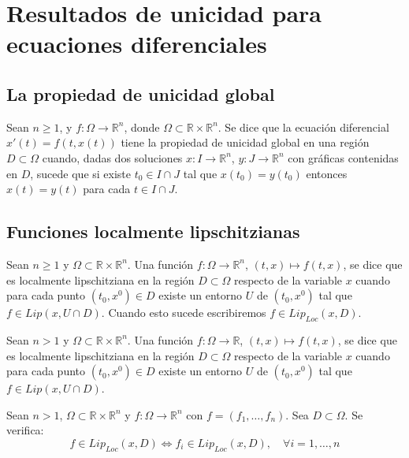 \chapter{Resultados de unicidad para ecuaciones diferenciales}
\section{La propiedad de unicidad global}
\begin{definition}
    Sean $n \geq 1$, y $f: \Omega \to \mathbb{R}^n$, donde $\Omega \subset \mathbb{R} \times \mathbb{R}^n$.
    Se dice que la ecuación diferencial $x'(t) = f(t, x(t))$ tiene la propiedad de unicidad global en una región $D \subset \Omega$ cuando, dadas dos soluciones $x: I \to \mathbb{R}^n$, $y: J \to \mathbb{R}^n$ con gráficas contenidas en $D$, sucede que si existe $t_0 \in I \cap J$ tal que $x(t_0) = y(t_0)$ entonces $x(t) = y(t)$ para cada $t \in I \cap J$.
\end{definition}

\section{Funciones localmente lipschitzianas}
\begin{definition}
    Sean $n \geq 1$ y $\Omega \subset \mathbb{R} \times \mathbb{R}^n$.
    Una función $f: \Omega \to \mathbb{R}^n$, $(t, x) \mapsto f(t, x)$, se dice que es localmente lipschitziana en la región $D \subset \Omega$ respecto de la variable $x$ cuando para cada punto $(t_0, x^0) \in D$ existe un entorno $U$ de $(t_0, x^0)$ tal que $f \in Lip(x, U \cap D)$.
    Cuando esto sucede escribiremos $f \in Lip_{Loc}(x, D)$.
\end{definition}

\begin{definition}
    Sean $n > 1$ y $\Omega \subset \mathbb{R} \times \mathbb{R}^n$.
    Una función $f: \Omega \to \mathbb{R}$, $(t, x) \mapsto f(t, x)$, se dice que es localmente lipschitziana en la región $D \subset \Omega$ respecto de la variable $x$ cuando para cada punto $(t_0, x^0) \in D$ existe un entorno $U$ de $(t_0, x^0)$ tal que $f \in Lip(x, U \cap D)$.
\end{definition}

\begin{proposition}
    Sean $n > 1$, $\Omega \subset \mathbb{R} \times \mathbb{R}^n$ y $f: \Omega \to \mathbb{R}^n$ con $f = (f_1, \dots, f_n)$.
    Sea $D \subset \Omega$.
    Se verifica:
    $$f \in Lip_{Loc}(x, D) \Leftrightarrow f_i \in Lip_{Loc}(x, D), \quad \forall i = 1, \dots, n$$
\end{proposition}

